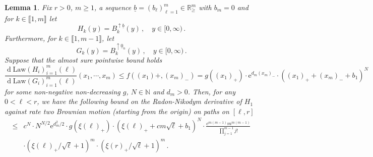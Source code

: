 \documentclass[11pt, reqno]{amsart}
\numberwithin{equation}{section}
\newcounter{dummy} \numberwithin{dummy}{section}
\newtheorem{lemma}[dummy]{Lemma}
\newcommand{\N}{\ensuremath{\mathbb{N}}}
\newcommand{\R}{\ensuremath{\mathbb{R}}}
\newcommand{\diff}{\ensuremath{\operatorname{d}\!}}
\begin{document}
\begin{lemma}\label{lemma: ptwise bound Radon-Nikodym  Warren}
Fix $r>0$, $m\ge 1$, a sequence $\underline{b}= (b_\ell)_{\ell =1}^m \in\R^m_{\ge}$ with $b_m = 0$ and for $k\in \llbracket 1, m \rrbracket$ let 
     $$H_k(y) = B^{\uparrow \underline{b}}_k(y)\, , \quad  y\in [0,\infty)\,.$$Furthermore, for $k\in \llbracket 1, m-1 \rrbracket$, let 
     $$G_k(y) = B^{\uparrow \underline{0}_n}_k(y)\, , \quad  y\in [0,\infty)\,.$$ Suppose that the almost sure pointwise bound holds
\begin{equation*}
      \frac{\diff \mathrm{Law}(H_i)_{i =1}^m(\ell)}{\diff\mathrm{Law}(G_i)_{i =1}^m(\ell)}(x_1, \cdots, x_m)  \le f((x_1)+, (x_m)_-) =  g((x_1)_+)\cdot \mathrm{e}^{d_m (x_m)_-}\cdot ((x_1)_++ (x_m)_-+b_1)^N
\end{equation*}
for some non-negative non-decreasing $g$, $N\in \N$ and $d_m>0$. Then, for any $0<\ell<r$, we have the following bound on the Radon-Nikodym  derivative of $H_1$ against rate two Brownian motion (starting from the origin) on paths on $[\ell, r]$ 
\begin{equation*}
    \begin{array}{cc}
     \le &c^N \cdot N^{N/2} \mathrm{e}^{d^2_m/2}\cdot g(\xi(\ell)_+)\cdot (\xi(\ell)_++ cm\sqrt{\ell}+b_1)^N \cdot  \frac{c^{m(m-1)}m^{m(m-1)}}{\prod_{j=1}^{m-1}j!}\\
    & \cdot (\xi(\ell)_+/\sqrt{\ell}+1)^m\cdot (\xi(r)_+/\sqrt{\ell}+1)^m\,.
    \end{array}
\end{equation*}
\end{lemma}
\end{document}
